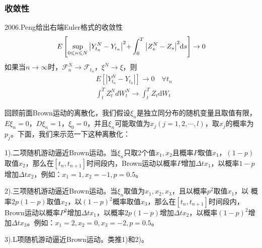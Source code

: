		\subsubsection{收敛性}
			\par
			2006.Peng给出右端Euler格式的收敛性
			\begin{align*}
			E\left[ {\mathop {\sup }\limits_{0 \leqslant n \leqslant N} {{\left| {Y_{{t_n}}^N - {Y_{{t_n}}}} \right|}^2}{\rm{ + }}\int_0^T {{{\left| {Z_s^N - {Z_s}} \right|}^2}\mathrm{d}s} } \right] \rightarrow 0
			\end{align*}
			如果当$n \to \infty $时，${{\mathcal{F}}_n^N} \to {{\mathcal{F}}_{t_n}}$，$\xi ^N \to \xi$，则
			\begin{align*}
			&E\left[ {\left| {Y_{{t_n}}^N - {Y_{{t_n}}}} \right|} \right] \to 0\quad \forall {t_n}\\
			&\int_t^T {Z_t^NdW_t^N}  \to \int_t^T {{Z_t}\mathrm{d}{W_t}}
			\end{align*}
			\par
			回顾前面Brown运动的离散化，我们假设$\xi_n$是独立同分布的随机变量且取值有限，$E\xi_n =0$，$D\xi_n =1$，$\xi_0=0$，并且$\xi_n$可能取值为$x_j(j=1,2,\cdots,l)$，取$x_j$的概率为$p_j$。下面，我们来示范一下这种离散化：
			\par
			1).二项随机游动逼近Brown运动。当$\xi_n$只取2个值$x_1,x_2$且概率$P$取值$x_1$，$(1-p)$取值$x_2$，那么在$[t_n,t_{n+1}]$时间段内，Brown运动以概率$P$增加${\Delta t{x_1}}$，以概率$1-p$增加${\Delta t{x_2}}$，例如：$x_1=1,x_2=-1,p=0.5$。
			\par
			2).三项随机游动逼近Brown运动。当$\xi_n$取值为$x_1,x_2,x_3$，且以概率$p^2$取值$x_1$，以 概率$2p(1-p)$取值$x_2$，以$(1-p)^2$概率取值$x_3$，那么在$[t_n,t_{n+1}]$时间段内，Brown运动以概率$P^2$增加${\Delta t{x_1}}$，以概率$2p(1-p)$增加${\Delta t{x_2}}$，以概率$(1-p)^2$增加${\Delta t{x_3}}$。例如：$x_1=2,x_2=0,x_3=-2,p=0.5$。
			\par
			3).L项随机游动逼近Brown运动。类推1)和2)。


